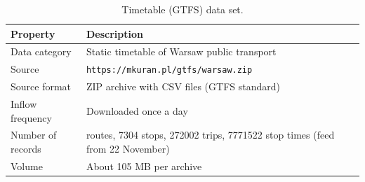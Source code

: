 \documentclass[11pt]{article}
\begin{document}
\begin{table}[H]
\centering
\caption{Timetable (GTFS) data set.}\label{tab:ds-gtfs}
\begin{tabular}{|>{\raggedright\arraybackslash}p{3cm}|>{\raggedright\arraybackslash}p{11cm}|}
\hline
\textbf{Property} & \textbf{Description} \\
\hline
Data category & Static timetable of Warsaw public transport \\ \hline
Source & \texttt{https://mkuran.pl/gtfs/warsaw.zip} \\ \hline
Source format & ZIP archive with CSV files (GTFS standard) \\ \hline
Inflow frequency & Downloaded once a day \\ \hline
Number of records & 324 routes, 7304 stops, 272002 trips, 7771522 stop times (feed from 22 November) \\ \hline
Volume & About 105 MB per archive \\ \hline
\end{tabular}
\end{table}
\end{document}
